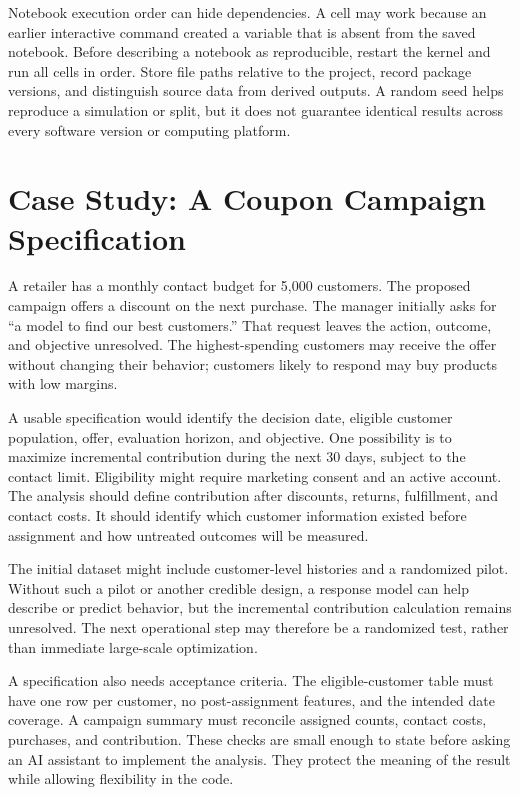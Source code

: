 Notebook execution order can hide dependencies. A cell may work because
an earlier interactive command created a variable that is absent from
the saved notebook. Before describing a notebook as reproducible,
restart the kernel and run all cells in order. Store file paths relative
to the project, record package versions, and distinguish source data
from derived outputs. A random seed helps reproduce a simulation or
split, but it does not guarantee identical results across every software
version or computing platform.

\hypertarget{M01-case-study-a-coupon-campaign-specification}{%
\section{Case Study: A Coupon Campaign
Specification}\label{M01-case-study-a-coupon-campaign-specification}}

\noindent A retailer has a monthly contact budget for 5,000 customers. The
proposed campaign offers a discount on the next purchase. The manager
initially asks for ``a model to find our best customers.'' That request
leaves the action, outcome, and objective unresolved. The
highest-spending customers may receive the offer without changing their
behavior; customers likely to respond may buy products with low margins.

A usable specification would identify the decision date, eligible
customer population, offer, evaluation horizon, and objective. One
possibility is to maximize incremental contribution during the next 30
days, subject to the contact limit. Eligibility might require marketing
consent and an active account. The analysis should define contribution
after discounts, returns, fulfillment, and contact costs. It should
identify which customer information existed before assignment and how
untreated outcomes will be measured.

The initial dataset might include customer-level histories and a
randomized pilot. Without such a pilot or another credible design, a
response model can help describe or predict behavior, but the
incremental contribution calculation remains unresolved. The next
operational step may therefore be a randomized test, rather than
immediate large-scale optimization.

A specification also needs acceptance criteria. The eligible-customer
table must have one row per customer, no post-assignment features, and
the intended date coverage. A campaign summary must reconcile assigned
counts, contact costs, purchases, and contribution. These checks are
small enough to state before asking an AI assistant to implement the
analysis. They protect the meaning of the result while allowing
flexibility in the code.

